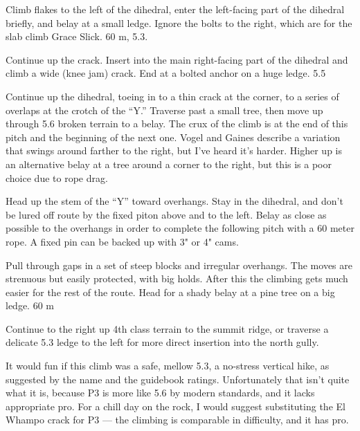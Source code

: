 \documentclass{tahquitz}
\begin{document}
\somespace

 Climb flakes to the left of the dihedral, enter the left-facing
part of the dihedral briefly, and belay at a small ledge. Ignore the
bolts to the right, which are for the slab climb Grace Slick. 60 m,
5.3.

 Continue up the crack. Insert into the main right-facing part of
the dihedral and climb a wide (knee jam) crack. End at a bolted
anchor on a huge ledge. 5.5

 Continue up the dihedral, toeing in to a thin crack at the
corner, to a series of overlaps at the crotch of the ``Y.'' Traverse
past a small tree, then move up through 5.6 broken terrain to a
belay. The crux of the climb is at the end of this pitch and the
beginning of the next one. Vogel and Gaines describe a variation that
swings around farther to the right, but I've heard it's harder.
Higher up is an alternative belay at a tree around a corner to the
right, but this is a poor choice due to rope drag.

 Head up the stem of the ``Y'' toward overhangs. Stay in the
dihedral, and don't be lured off route by the fixed piton above and
to the left. Belay as close as possible to the overhangs in order to
complete the following pitch with a 60 meter rope. A fixed pin can be
backed up with 3" or 4" cams.

 Pull through gaps in a set of steep blocks and irregular
overhangs. The  moves are strenuous but easily protected, with big
holds. After this the climbing gets much easier for the rest of the
route. Head for a shady belay at a pine tree on a big ledge. 60 m

 Continue to the right up 4th class terrain to the summit ridge,
or traverse a delicate 5.3 ledge to the left for more direct
insertion into the north gully.

\somespace

\northgully





It would fun if this climb was a safe, mellow 5.3, a no-stress
vertical hike, as suggested by the name and the guidebook ratings.
Unfortunately that isn't quite what it is, because P3 is more like 5.6
by modern standards, and it lacks appropriate pro. For a chill day on the
rock, I would suggest substituting the El Whampo crack for P3 --- the climbing
is comparable in difficulty, and it has pro.
\end{document}
